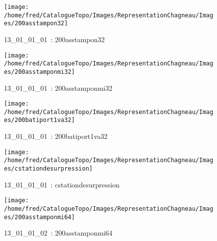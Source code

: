 \documentclass[12pt,titlepage]{book}
\begin{document}
\begin{figure}[h!]
  \hfill         %
  \begin{minipage}[t]{3cm}
    \begin{center}
      \texttt{[image: /home/fred/CatalogueTopo/Images/RepresentationChagneau/Images/200asstampon32]}
      \caption[~13\_01\_01\_01]{\small{13\_01\_01\_01~:} \tiny{200asstampon32}}\label{200asstampon32}
    \end{center}
  \end{minipage}
  \begin{minipage}[t]{3cm}
    \begin{center}
      \texttt{[image: /home/fred/CatalogueTopo/Images/RepresentationChagneau/Images/200asstamponmi32]}
      \caption[~13\_01\_01\_01]{\small{13\_01\_01\_01~:} \tiny{200asstamponmi32}}\label{200asstamponmi32}
    \end{center}
  \end{minipage}
  \begin{minipage}[t]{3cm}
    \begin{center}
      \texttt{[image: /home/fred/CatalogueTopo/Images/RepresentationChagneau/Images/200batiport1va32]}
      \caption[~13\_01\_01\_01]{\small{13\_01\_01\_01~:} \tiny{200batiport1va32}}\label{200batiport1va32}
    \end{center}
  \end{minipage}
  \begin{minipage}[t]{3cm}
    \begin{center}
      \texttt{[image: /home/fred/CatalogueTopo/Images/RepresentationChagneau/Images/cstationdesurpression]}
      \caption[~13\_01\_01\_01]{\small{13\_01\_01\_01~:} \tiny{cstationdesurpression}}\label{cstationdesurpression}
    \end{center}
  \end{minipage}
  \begin{minipage}[t]{3cm}
    \begin{center}
      \texttt{[image: /home/fred/CatalogueTopo/Images/RepresentationChagneau/Images/200asstamponmi64]}
      \caption[~13\_01\_01\_02]{\small{13\_01\_01\_02~:} \tiny{200asstamponmi64}}\label{200asstamponmi64}
    \end{center}
  \end{minipage}

\end{figure}
\end{document}
